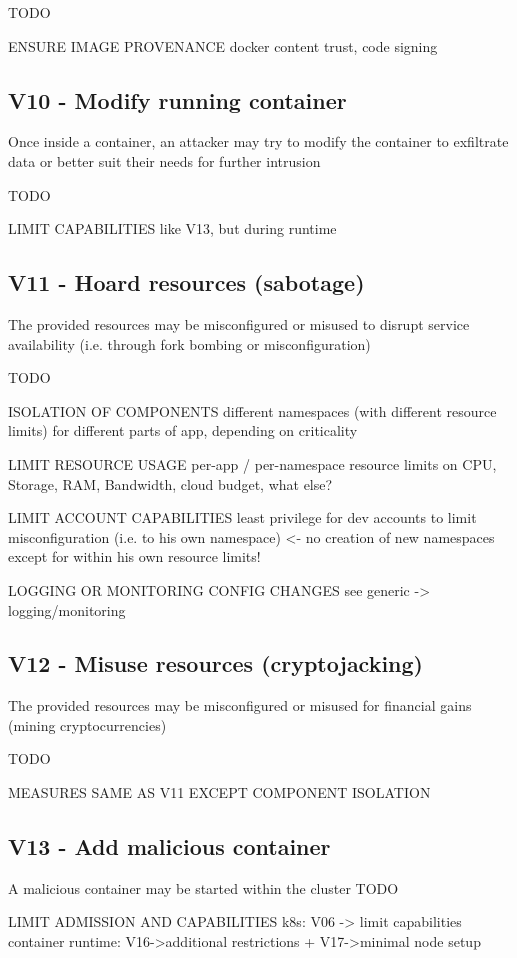 TODO

ENSURE IMAGE PROVENANCE
	docker content trust, code signing


\subsection{V10 - Modify running container}
Once inside a container, an attacker may try to modify the container to exfiltrate data or better suit their needs for further intrusion

TODO

LIMIT CAPABILITIES
	like V13, but during runtime

\subsection{V11 - Hoard resources (sabotage)}
The provided resources may be misconfigured or misused to disrupt service availability (i.e. through fork bombing or misconfiguration)

TODO

ISOLATION OF COMPONENTS
	different namespaces (with different resource limits) for different parts of app, depending on criticality
	
LIMIT RESOURCE USAGE
	per-app / per-namespace resource limits on CPU, Storage, RAM, Bandwidth, cloud budget, what else?
	
LIMIT ACCOUNT CAPABILITIES
	least privilege for dev accounts to limit misconfiguration (i.e. to his own namespace) <- no creation of new namespaces except for within his own resource limits!
	
LOGGING OR MONITORING CONFIG CHANGES
	see generic -> logging/monitoring

\subsection{V12 - Misuse resources (cryptojacking)}
The provided resources may be misconfigured or misused for financial gains (mining cryptocurrencies)

TODO

MEASURES SAME AS V11 EXCEPT COMPONENT ISOLATION

\subsection{V13 - Add malicious container}
A malicious container may be started within the cluster
TODO

LIMIT ADMISSION AND CAPABILITIES
	k8s: V06 -> limit capabilities
	container runtime: V16->additional restrictions + V17->minimal node setup


